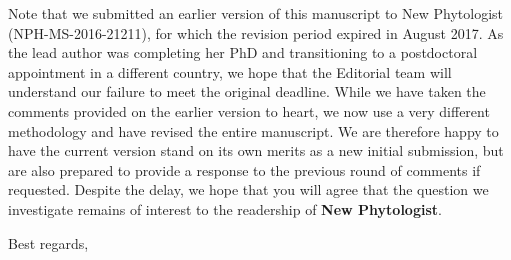 \documentclass[12pt]{letter}
\begin{document}
\begin{letter}
\begin{enumerate}
	\end{enumerate}

	Note that we submitted an earlier version of this manuscript to New Phytologist (NPH-MS-2016-21211), for which the revision period expired in August 2017. As the lead author was completing her PhD and transitioning to a postdoctoral appointment in a different country, we hope that the Editorial team will understand our failure to meet the original deadline. While we have taken the comments provided on the earlier version to heart, we now use a very different methodology and have revised the entire manuscript. We are therefore happy to have the current version stand on its own merits as a new initial submission, but are also prepared to provide a response to the previous round of comments if requested. Despite the delay, we hope that you will agree that the question we investigate remains of interest to the readership of \textbf{New Phytologist}.









\closing{Best regards,}


\end{letter}
\end{document}

